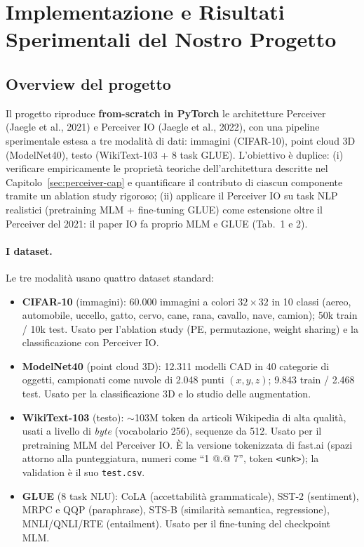 \documentclass[
  11pt,
]{article}
\begin{document}
\section{Implementazione e Risultati Sperimentali del Nostro Progetto}
\label{sec:progetto}

\subsection{Overview del progetto}
\label{sec:progetto-overview}

Il progetto riproduce \textbf{from-scratch in PyTorch} le architetture Perceiver (Jaegle et al., 2021) e Perceiver IO (Jaegle et al., 2022), con una pipeline sperimentale estesa a tre modalità di dati: immagini (CIFAR-10), point cloud 3D (ModelNet40), testo (WikiText-103 + 8 task GLUE). L'obiettivo è duplice: (i) verificare empiricamente le proprietà teoriche dell'architettura descritte nel Capitolo~\ref{sec:perceiver-cap} e quantificare il contributo di ciascun componente tramite un ablation study rigoroso; (ii) applicare il Perceiver IO su task NLP realistici (pretraining MLM + fine-tuning GLUE) come estensione oltre il Perceiver del 2021: il paper IO fa proprio MLM e GLUE (Tab.~1 e 2).

\paragraph{I dataset.} Le tre modalità usano quattro dataset standard:
\begin{itemize}
\item \textbf{CIFAR-10} (immagini): 60.000 immagini a colori $32\times32$ in 10 classi (aereo, automobile, uccello, gatto, cervo, cane, rana, cavallo, nave, camion); 50k train / 10k test. Usato per l'ablation study (PE, permutazione, weight sharing) e la classificazione con Perceiver IO.
\item \textbf{ModelNet40} (point cloud 3D): 12.311 modelli CAD in 40 categorie di oggetti, campionati come nuvole di 2.048 punti $(x,y,z)$; 9.843 train / 2.468 test. Usato per la classificazione 3D e lo studio delle augmentation.
\item \textbf{WikiText-103} (testo): $\sim$103M token da articoli Wikipedia di alta qualità, usati a livello di \emph{byte} (vocabolario 256), sequenze da 512. Usato per il pretraining MLM del Perceiver IO. È la versione tokenizzata di fast.ai (spazi attorno alla punteggiatura, numeri come ``1 @.@ 7'', token \texttt{<unk>}); la validation è il suo \texttt{test.csv}.
\item \textbf{GLUE} (8 task NLU): CoLA (accettabilità grammaticale), SST-2 (sentiment), MRPC e QQP (paraphrase), STS-B (similarità semantica, regressione), MNLI/QNLI/RTE (entailment). Usato per il fine-tuning del checkpoint MLM.
\end{itemize}
\end{document}
